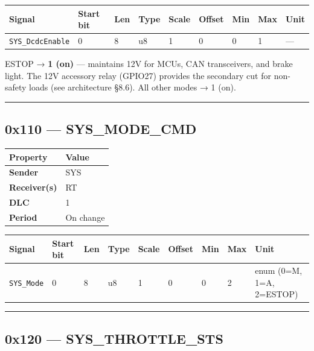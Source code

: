 \begin{longtable}[]{@{}lllllllll@{}}
\toprule\noalign{}
Signal & Start bit & Len & Type & Scale & Offset & Min & Max & Unit \\
\midrule\noalign{}
\endhead
\bottomrule\noalign{}
\endlastfoot
\texttt{SYS\_DcdcEnable} & 0 & 8 & u8 & 1 & 0 & 0 & 1 & --- \\
\end{longtable}

ESTOP → \textbf{1 (on)} --- maintains 12V for MCUs, CAN transceivers, and brake
light. The 12V accessory relay (GPIO27) provides the secondary cut for
non-safety loads (see architecture §8.6). All other modes → 1 (on).

\begin{center}\rule{0.5\linewidth}{0.5pt}\end{center}

\subsection{0x110 --- SYS\_MODE\_CMD}\label{x110-sys_mode_cmd}

\begin{longtable}[]{@{}ll@{}}
\toprule\noalign{}
Property & Value \\
\midrule\noalign{}
\endhead
\bottomrule\noalign{}
\endlastfoot
\textbf{Sender} & SYS \\
\textbf{Receiver(s)} & RT \\
\textbf{DLC} & 1 \\
\textbf{Period} & On change \\
\end{longtable}

\begin{longtable}[]{@{}lllllllll@{}}
\toprule\noalign{}
Signal & Start bit & Len & Type & Scale & Offset & Min & Max & Unit \\
\midrule\noalign{}
\endhead
\bottomrule\noalign{}
\endlastfoot
\texttt{SYS\_Mode} & 0 & 8 & u8 & 1 & 0 & 0 & 2 & enum (0=M, 1=A, 2=ESTOP) \\
\end{longtable}

\begin{center}\rule{0.5\linewidth}{0.5pt}\end{center}

\subsection{0x120 --- SYS\_THROTTLE\_STS}\label{x120-sys_throttle_sts}

